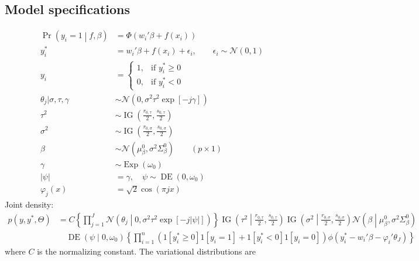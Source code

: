 \documentclass[11pt]{article}
\newcommand{\opn}{\operatorname}
\begin{document}
\subsection{Model specifications}
\begin{align*}
  \opn{Pr}\left(y_{i}=1\middle| f, \beta\right) &= \Phi\left(w_{i}'\beta + f\left(x_{i}\right)\right)\\
  y_{i}^{*} &= w_{i}'\beta + f\left(x_{i}\right) + \epsilon_{i}, \qquad \epsilon_{i} \sim \mathcal{N}\left(0,1\right)\\
  y_{i} &= \begin{cases}1, & \text{if $y_{i}^{*} \geq 0$}\\ 0, & \text{if $y_{i}^{*} <0$}  \end{cases}\\
  \theta_{j}|\sigma, \tau, \gamma &\sim \mathcal{N}\left(0, \sigma^{2}\tau^{2}\exp\left[-j\gamma\right]\right)\\
  \tau^{2} &\sim \opn{IG}\left(\frac{r_{0,\tau}}{2}, \frac{s_{0,\tau}}{2}\right)\\
  \sigma^{2} &\sim \opn{IG}\left(\frac{r_{0,\sigma}}{2}, \frac{s_{0,\sigma}}{2}\right)\\
  \beta &\sim \mathcal{N}\left(\mu_{\beta}^{0}, \sigma^{2}\Sigma_{\beta}^{0}\right)\qquad \left(p\times 1 \right)\\
  \gamma &\sim \opn{Exp}\left(\omega_{0}\right)\\
  \left|\psi\right| &= \gamma, \quad \psi \sim \opn{DE}\left(0, \omega_{0}\right)\\
  \varphi_{j}\left(x\right) &= \sqrt{2}\cos\left(\pi j x\right)
\end{align*}
Joint density:
\begin{align*}
  p\left(y, y^{*}, \Theta\right) &= C\left\{\prod_{j=1}^{J}\mathcal{N}\left(\theta_{j}\middle| 0, \sigma^{2}\tau^{2}\exp\left[-j\left|\psi\right|\right]\right) \right\}\opn{IG}\left(\tau^{2}\middle|\frac{r_{0,\tau}}{2},\frac{s_{0,\tau}}{2}\right)\opn{IG}\left(\sigma^{2}\middle|\frac{r_{0,\sigma}}{2},\frac{s_{0,\sigma}}{2}\right)\mathcal{N}\left(\beta\middle|\mu_{\beta}^{0},\sigma^{2}\Sigma_{\beta}^{0}\right)\\
  &\quad \opn{DE}\left(\psi\middle|0,\omega_{0}\right)\left\{\prod_{i=1}^{n}\left(1\left[y_{i}^{*}\geq 0\right]1\left[y_{i}=1\right] + 1\left[y_{i}^{*}<0\right]1\left[y_{i}=0\right] \right)\phi\left(y_{i}^{*}-w_{i}'\beta - \varphi_{i}'\theta_{J}\right)\right\}
\end{align*}
where $C$ is the normalizing constant. The variational distributions are
\end{document}
